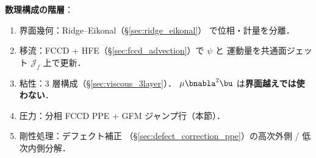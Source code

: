 \noindent\textbf{数理構成の階層}：
\begin{enumerate}[leftmargin=2em,noitemsep]
  \item 界面幾何：Ridge--Eikonal（\S\ref{sec:ridge_eikonal}）
        で位相・計量を分離．
  \item 移流：FCCD + HFE（\S\ref{sec:fccd_advection}）で $\psi$ と
        運動量を共通面ジェット $\mathcal{J}_f$ 上で更新．
  \item 粘性：3 層構成（\S\ref{sec:viscous_3layer}）．
        $\mu\bnabla^2\bu$ は\textbf{界面越えでは使わない}．
  \item 圧力：分相 FCCD PPE + GFM ジャンプ行（本節）．
  \item 剛性処理：デフェクト補正
        （\S\ref{sec:defect_correction_ppe}）の高次外側 / 低次内側分解．
\end{enumerate}

